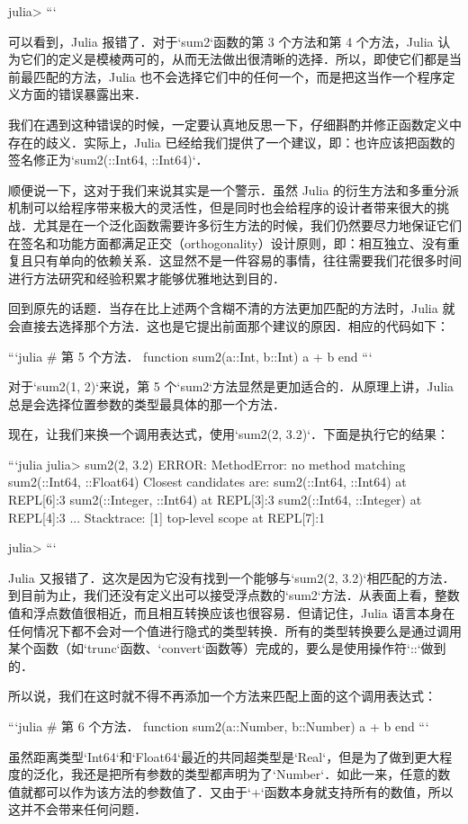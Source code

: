 julia> 
```

可以看到，Julia 报错了．对于`sum2`函数的第 3 个方法和第 4 个方法，Julia 认为它们的定义是模棱两可的，从而无法做出很清晰的选择．所以，即使它们都是当前最匹配的方法，Julia 也不会选择它们中的任何一个，而是把这当作一个程序定义方面的错误暴露出来．

我们在遇到这种错误的时候，一定要认真地反思一下，仔细斟酌并修正函数定义中存在的歧义．实际上，Julia 已经给我们提供了一个建议，即：也许应该把函数的签名修正为`sum2(::Int64, ::Int64)`．

顺便说一下，这对于我们来说其实是一个警示．虽然 Julia 的衍生方法和多重分派机制可以给程序带来极大的灵活性，但是同时也会给程序的设计者带来很大的挑战．尤其是在一个泛化函数需要许多衍生方法的时候，我们仍然要尽力地保证它们在签名和功能方面都满足正交（orthogonality）设计原则，即：相互独立、没有重复且只有单向的依赖关系．这显然不是一件容易的事情，往往需要我们花很多时间进行方法研究和经验积累才能够优雅地达到目的．

回到原先的话题．当存在比上述两个含糊不清的方法更加匹配的方法时，Julia 就会直接去选择那个方法．这也是它提出前面那个建议的原因．相应的代码如下：

```julia
# 第 5 个方法．
function sum2(a::Int, b::Int)
    a + b
end
```

对于`sum2(1, 2)`来说，第 5 个`sum2`方法显然是更加适合的．从原理上讲，Julia 总是会选择位置参数的类型最具体的那一个方法．

现在，让我们来换一个调用表达式，使用`sum2(2, 3.2)`．下面是执行它的结果：

```julia
julia> sum2(2, 3.2)
ERROR: MethodError: no method matching sum2(::Int64, ::Float64)
Closest candidates are:
  sum2(::Int64, ::Int64) at REPL[6]:3
  sum2(::Integer, ::Int64) at REPL[3]:3
  sum2(::Int64, ::Integer) at REPL[4]:3
  ...
Stacktrace:
 [1] top-level scope at REPL[7]:1

julia> 
```

Julia 又报错了．这次是因为它没有找到一个能够与`sum2(2, 3.2)`相匹配的方法．到目前为止，我们还没有定义出可以接受浮点数的`sum2`方法．从表面上看，整数值和浮点数值很相近，而且相互转换应该也很容易．但请记住，Julia 语言本身在任何情况下都不会对一个值进行隐式的类型转换．所有的类型转换要么是通过调用某个函数（如`trunc`函数、`convert`函数等）完成的，要么是使用操作符`::`做到的．

所以说，我们在这时就不得不再添加一个方法来匹配上面的这个调用表达式：

```julia
# 第 6 个方法．
function sum2(a::Number, b::Number)
    a + b
end
```

虽然距离类型`Int64`和`Float64`最近的共同超类型是`Real`，但是为了做到更大程度的泛化，我还是把所有参数的类型都声明为了`Number`．如此一来，任意的数值就都可以作为该方法的参数值了．又由于`+`函数本身就支持所有的数值，所以这并不会带来任何问题．

